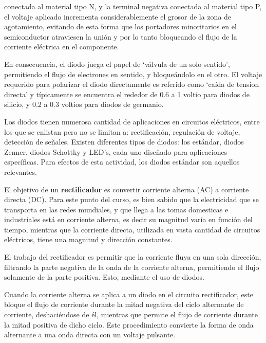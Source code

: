 \documentclass[12pt]{article}
\begin{document}
        conectada al material tipo N, y la terminal negativa conectada al material tipo P, el voltaje 
        aplicado incrementa considerablemente el grosor de la zona de agotamiento, evitando de esta forma
        que los portadores minoritarios en el semiconductor atraviesen la unión y por lo tanto 
        bloqueando el flujo de la corriente eléctrica en el componente.\par
        En consecuencia, el diodo juega el papel de `válvula de un solo sentido', permitiendo el flujo
        de electrones en sentido, y bloqueándolo en el otro. El voltaje requerido para polarizar el diodo
        directamente es referido como `caída de tension directa' y típicamente se encuentra el rededor
        de 0.6 a 1 voltio para diodos de silicio, y 0.2 a 0.3 voltios para diodos de germanio.\par
        Los diodos tienen numerosa cantidad de aplicaciones en circuitos eléctricos, entre los que se
        enlistan pero no se limitan a: rectificación, regulación de voltaje, detección de señales.
        Existen diferentes tipos de diodos: los estándar, diodos Zenner, diodos Schottky y LED's, cada
        uno diseñado para aplicaciones específicas. Para efectos de esta actividad, los diodos
        estándar son aquellos relevantes.\par
        
        El objetivo de un \textbf{rectificador} es convertir corriente alterna (AC) a corriente directa (DC).
        Para este punto del curso, es bien sabido que la electricidad que se transporta en las redes
        mundiales, y que llega a las tomas domesticas e industriales está en corriente alterna, es decir
        su magnitud varía en función del tiempo, mientras que la corriente directa, utilizada en vasta
        cantidad de circuitos eléctricos, tiene una magnitud y dirección constantes.\par

        El trabajo del rectificador es permitir que la corriente fluya en una sola dirección, filtrando
        la parte negativa de la onda de la corriente alterna, permitiendo el flujo solamente de la parte
        positiva. Esto, mediante el uso de diodos.\par

        Cuando la corriente alterna se aplica a un diodo en el circuito rectificador, este bloque
        el flujo de corriente durante la mitad negativa del ciclo alternante de corriente, deshaciéndose 
        de él, mientras que permite el flujo de corriente durante la mitad positiva de dicho ciclo. Este
        procedimiento convierte la forma de onda alternante a una onda directa con un voltaje pulsante.\par
\end{document}
